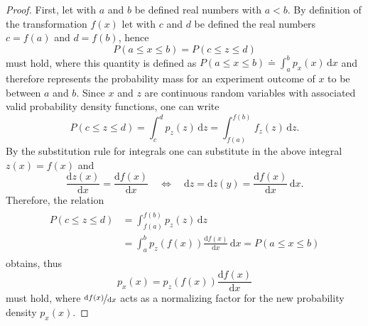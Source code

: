 \documentclass[a4paper,12pt]{report}
\def\lk#1{{\color{black}{#1}}}
\begin{document}
\begin{proof}
First, let with $a$ and $b$ be defined real numbers with $a<b$. By definition of the transformation $f(x)$ let with $c$ and $d$ be defined the real numbers $c = f(a)$ and $d=f(b)$, hence \begin{equation}
P(a \leq x \leq b) = P(c \leq z \leq d)
\end{equation} must hold, where this quantity is defined as $P(a \leq x \leq b) \doteq \int_a^b p_x(x)\,\mathrm{d}x$ and therefore represents the probability mass for an experiment outcome of $x$ to be between $a$ and $b$. Since $x$ and $z$ are continuous random variables with associated valid probability density functions, one can write \begin{equation}
P(c \leq z \leq d) = \int_c^d p_z(z)\,\mathrm{d}z = \int_{f(a)}^{f(b)}f_z(z)\,\mathrm{d}z.
\end{equation} By the substitution rule for integrals one can substitute in the above integral $z(x) = f(x)$ and \lk{hence derives} \begin{equation}
\frac{\mathrm{d}z(x)}{\mathrm{d}x} = \frac{\mathrm{d}f(x)}{\mathrm{d}x} \quad \Leftrightarrow \quad \mathrm{d}z=\mathrm{d}z(y) = \frac{\mathrm{d}f(x)}{\mathrm{d}x}\,\mathrm{d}x.
\end{equation} Therefore, the relation \begin{align}\begin{aligned}
P(c \leq z \leq d) &= \int_{f(a)}^{f(b)}p_z(z)\,\mathrm{d}z \\ &= \int_{a}^{b}p_z(f(x))\frac{\mathrm{d}f(x)}{\mathrm{d}x}\,\mathrm{d}x = P(a \leq x \leq b)
\end{aligned}\end{align} obtains, thus
\begin{equation}
p_x(x) = p_z(f(x))\frac{\mathrm{d}f(x)}{\mathrm{d}x}
\end{equation}
must hold, where $\nicefrac{\mathrm{d}f(x)}{\mathrm{d}x}$ acts as a normalizing factor for the new probability density $p_x(x)$.
\end{proof}
\end{document}
